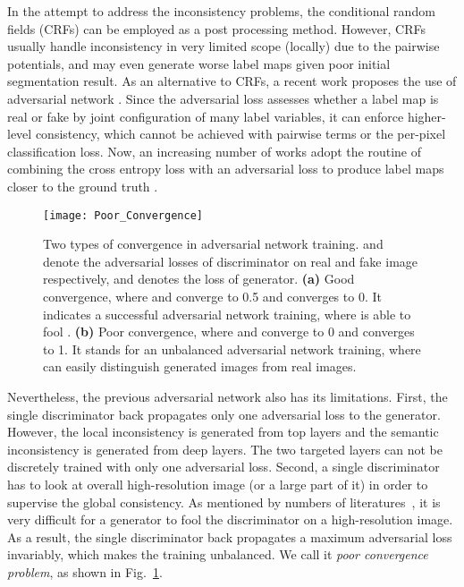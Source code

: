 \documentclass[runningheads]{llncs}
\begin{document}
In the attempt to address the inconsistency problems, the conditional random fields (CRFs) \cite{krahenbuhl2011efficient} can be employed as a post processing method. However, CRFs usually handle inconsistency in very limited scope (locally) due to the pairwise potentials, and may even generate worse label maps given poor initial segmentation result. As an alternative to CRFs, a recent work proposes the use of adversarial network \cite{luc2016semantic}. Since the adversarial loss assesses whether a label map is real or fake by joint configuration of many label variables, it can enforce higher-level consistency, which cannot be achieved with pairwise terms or the per-pixel classification loss. Now, an increasing number of works adopt the routine of combining the cross entropy loss with an adversarial loss to produce label maps closer to the ground truth \cite{dai2017scan,moeskops2017adversarial,hung2018adversarial}.

\begin{figure}[t]
\centering
\texttt{[image: Poor\_Convergence]}

\caption{Two types of convergence in adversarial network training.  and  denote the adversarial losses of discriminator on real and fake image respectively, and  denotes the loss of generator. \textbf{(a)} Good convergence, where  and  converge to 0.5 and  converges to 0. It indicates a successful adversarial network training, where  is able to fool . \textbf{(b)} Poor convergence, where  and  converge to 0 and  converges to 1. It stands for an unbalanced adversarial network training, where  can easily distinguish generated images from real images.}
\label{fig:poor}
\end{figure}

Nevertheless, the previous adversarial network also has its limitations. First, the single discriminator back propagates only one adversarial loss to the generator. However, the local inconsistency is generated from top layers and the semantic inconsistency is generated from deep layers. The two targeted layers can not be discretely trained with only one adversarial loss. Second, a single discriminator has to look at overall high-resolution image (or a large part of it) in order to supervise the global consistency. As mentioned by numbers of literatures~\cite{denton2015pyramid,karras2017progressive}, it is very difficult for a generator to fool the discriminator on a high-resolution image. As a result, the single discriminator back propagates a maximum adversarial loss invariably, which makes the training unbalanced. We call it \emph{poor convergence problem}, as shown in Fig.~\ref{fig:poor}.
\end{document}
